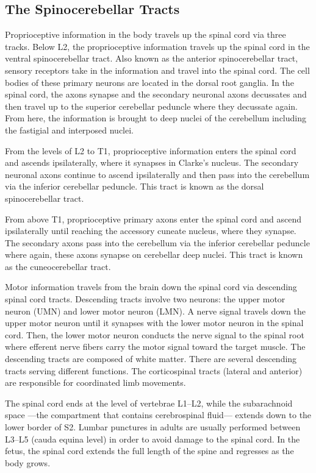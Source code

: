 \hypertarget{the-spinocerebellar-tracts}{%
\subsection{The Spinocerebellar Tracts}\label{the-spinocerebellar-tracts}}

Proprioceptive information in the body travels up the spinal cord via three tracks. Below L2, the proprioceptive information travels up the spinal cord in the ventral spinocerebellar tract. Also known as the anterior spinocerebellar tract, sensory receptors take in the information and travel into the spinal cord. The cell bodies of these primary neurons are located in the dorsal root ganglia. In the spinal cord, the axons synapse and the secondary neuronal axons decussates and then travel up to the superior cerebellar peduncle where they decussate again. From here, the information is brought to deep nuclei of the cerebellum including the fastigial and interposed nuclei.

From the levels of L2 to T1, proprioceptive information enters the spinal cord and ascends ipsilaterally, where it synapses in Clarke's nucleus. The secondary neuronal axons continue to ascend ipsilaterally and then pass into the cerebellum via the inferior cerebellar peduncle. This tract is known as the dorsal spinocerebellar tract.

From above T1, proprioceptive primary axons enter the spinal cord and ascend ipsilaterally until reaching the accessory cuneate nucleus, where they synapse. The secondary axons pass into the cerebellum via the inferior cerebellar peduncle where again, these axons synapse on cerebellar deep nuclei. This tract is known as the cuneocerebellar tract.

Motor information travels from the brain down the spinal cord via descending spinal cord tracts. Descending tracts involve two neurons: the upper motor neuron (UMN) and lower motor neuron (LMN). A nerve signal travels down the upper motor neuron until it synapses with the lower motor neuron in the spinal cord. Then, the lower motor neuron conducts the nerve signal to the spinal root where efferent nerve fibers carry the motor signal toward the target muscle. The descending tracts are composed of white matter. There are several descending tracts serving different functions. The corticospinal tracts (lateral and anterior) are responsible for coordinated limb movements.

The spinal cord ends at the level of vertebrae L1--L2, while the subarachnoid space ---the compartment that contains cerebrospinal fluid--- extends down to the lower border of S2. Lumbar punctures in adults are usually performed between L3--L5 (cauda equina level) in order to avoid damage to the spinal cord. In the fetus, the spinal cord extends the full length of the spine and regresses as the body grows.

